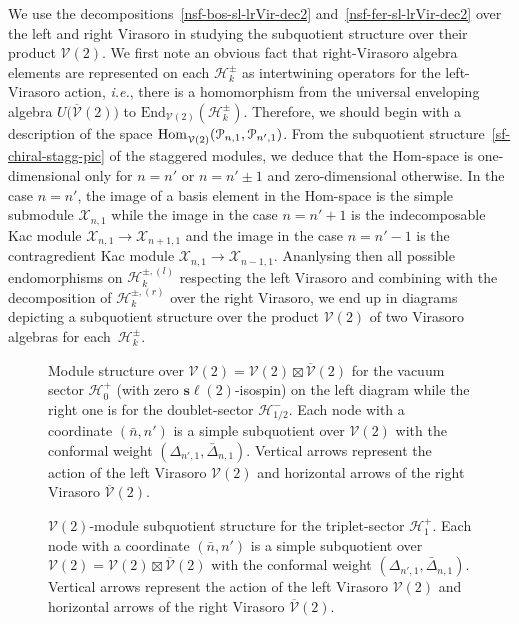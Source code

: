 \documentclass[11pt]{article}
\newcommand{\Endo}{\mathrm{End}}
\newcommand{\Hom}{\mathrm{Hom}}
\newcommand{\Vir}{\mathcal{V}}
\newcommand{\VirN}{\boldsymbol{\mathcal{V}}}
\newcommand{\nSU}{\boldsymbol{s\ell}}
\newcommand{\HomVir}{\mathrm{Hom}_{\rule{0pt}{6.5pt}%
{\Vir(2)}}}
\newcommand{\bimnch}{\boldsymbol{\mathcal{H}}}
\newcommand{\bimn}{\bimnch^{\pm}}
\newcommand{\bimnl}{\bimnch^{\pm,(l)}}
\newcommand{\bimnr}{\bimnch^{\pm,(r)}}
\newcommand{\bimnbos}{\bimnch^{+}}
\newcommand{\bimnfer}{\bimnch^{-}}
\newcommand{\VX}{\mathcal{X}}
\newcommand{\VP}{\mathcal{P}}
\theoremstyle{definition}
\begin{document}
We use the decompositions~\eqref{nsf-bos-sl-lrVir-dec2}
and~\eqref{nsf-fer-sl-lrVir-dec2} over the left and right Virasoro in
studying the subquotient structure over their product $\VirN(2)$.  We
first note an obvious fact that right-Virasoro algebra elements are
represented on each $\bimn_k$ as  intertwining operators for the left-Virasoro action,
{\it i.e.}, there is a homomorphism from the universal enveloping algebra $U
\bigl(\overline{\Vir}(2)\bigr)$ to $\Endo_{\Vir(2)}(\bimn_k)$. Therefore, we should begin with a  description of the space
$\HomVir(\VP_{n,1},\VP_{n',1})$. From  the subquotient structure~\eqref{sf-chiral-stagg-pic} of
the staggered modules, we deduce that the $\Hom$-space is one-dimensional
only for $n=n'$ or $n=n'\pm1$ and zero-dimensional otherwise. In the case
$n=n'$, the image of a basis element in the $\Hom$-space is the simple
submodule $\VX_{n,1}$ while the image in the case $n=n'+1$ is the indecomposable Kac
module $\VX_{n,1}\to\VX_{n+1,1}$ and the image in the case $n=n'-1$ is the contragredient Kac
module $\VX_{n,1}\to\VX_{n-1,1}$. Ananlysing then all possible
endomorphisms on $\bimnl_k$ respecting the left Virasoro and combining with the
decomposition of $\bimnr_k$ over the right Virasoro, we end up in
diagrams depicting a subquotient structure over the
product $\VirN(2)$ of two Virasoro algebras for each~$\bimn_k$.

\begin{figure}\centering
{\scriptsize
  \def\svgwidth{450pt}
    
}
    \caption{Module structure over $\VirN(2)=\Vir(2)\boxtimes\overline{\Vir}(2)$
    for the vacuum sector $\bimnbos_0$ (with zero $\nSU(2)$-isospin) on the left
    diagram while the right one is for the doublet-sector $\bimnfer_{1/2}$.  Each node with a coordinate
     $(\bar{n},n')$ is a simple subquotient over
     $\VirN(2)$ with the conformal
     weight $(\Delta_{n',1},\bar{\Delta}_{n,1})$. Vertical arrows represent
    the action of the left Virasoro $\Vir(2)$ and horizontal arrows of the
    right Virasoro $\overline{\Vir}(2)$.}
    \label{sfnonchiralvirvac}
    \end{figure}
\begin{figure}\centering
{\small
\mbox{}\bigskip
  \def\svgwidth{350pt}
    
}
   \caption{$\VirN(2)$-module subquotient structure for the
     triplet-sector $\bimnbos_1$.  Each node with a coordinate
     $(\bar{n},n')$ is a simple subquotient over
     $\VirN(2)=\Vir(2)\boxtimes\overline{\Vir}(2)$ with the conformal
     weight $(\Delta_{n',1},\bar{\Delta}_{n,1})$. Vertical arrows
     represent the action of the left Virasoro $\Vir(2)$ and
     horizontal arrows of the right Virasoro $\overline{\Vir}(2)$.
   }
   \label{sfnonchiralVirtripl}
    \end{figure}
\end{document}
